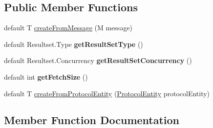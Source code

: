 \subsection*{Public Member Functions}
\begin{DoxyCompactItemize}
\item 
default T \mbox{\hyperlink{interfacecom_1_1mysql_1_1cj_1_1protocol_1_1_protocol_entity_factory_af941b07e2292c91098a6af048c154803}{create\+From\+Message}} (M message)
\item 
\mbox{\label{interfacecom_1_1mysql_1_1cj_1_1protocol_1_1_protocol_entity_factory_a288de4370d4af19186625e7404b4cca5}} 
default Resultset.\+Type {\bfseries get\+Result\+Set\+Type} ()
\item 
\mbox{\label{interfacecom_1_1mysql_1_1cj_1_1protocol_1_1_protocol_entity_factory_ab5bf153eafa066fe2d98fd6bd8372972}} 
default Resultset.\+Concurrency {\bfseries get\+Result\+Set\+Concurrency} ()
\item 
\mbox{\label{interfacecom_1_1mysql_1_1cj_1_1protocol_1_1_protocol_entity_factory_aa0fc4c08a86fe8f58381439d04389afd}} 
default int {\bfseries get\+Fetch\+Size} ()
\item 
default T \mbox{\hyperlink{interfacecom_1_1mysql_1_1cj_1_1protocol_1_1_protocol_entity_factory_a282b14fecc86c7202cd9361333235ef8}{create\+From\+Protocol\+Entity}} (\mbox{\hyperlink{interfacecom_1_1mysql_1_1cj_1_1protocol_1_1_protocol_entity}{Protocol\+Entity}} protocol\+Entity)
\end{DoxyCompactItemize}


\subsection{Member Function Documentation}
\mbox{\label{interfacecom_1_1mysql_1_1cj_1_1protocol_1_1_protocol_entity_factory_af941b07e2292c91098a6af048c154803}} 
